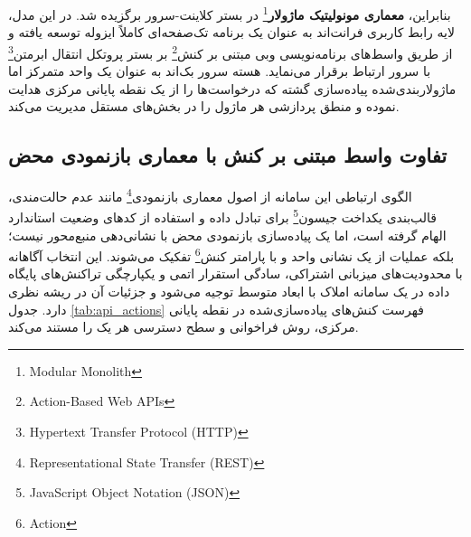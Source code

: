 \documentclass[11pt, a4paper]{report}
\newcommand{\enfootnote}[1]{\footnote{\foreignlanguage{english}{#1}}}
\begin{document}
بنابراین، \textbf{معماری مونولیتیک ماژولار}\enfootnote{Modular Monolith} در بستر کلاینت-سرور برگزیده شد. در این مدل، لایه رابط کاربری فرانت‌اند به عنوان یک برنامه تک‌صفحه‌ای کاملاً ایزوله توسعه یافته و از طریق واسط‌های برنامه‌نویسی وبی مبتنی بر کنش\enfootnote{Action-Based Web APIs} بر بستر پروتکل انتقال ابرمتن\enfootnote{Hypertext Transfer Protocol (HTTP)} با سرور ارتباط برقرار می‌نماید. هسته سرور بک‌اند به عنوان یک واحد متمرکز اما ماژولاربندی‌شده پیاده‌سازی گشته که درخواست‌ها را از یک نقطه پایانی مرکزی هدایت نموده و منطق پردازشی هر ماژول را در بخش‌های مستقل مدیریت می‌کند.

\subsection{تفاوت واسط مبتنی بر کنش با معماری بازنمودی محض}
الگوی ارتباطی این سامانه از اصول معماری بازنمودی\enfootnote{Representational State Transfer (REST)} مانند عدم حالت‌مندی، قالب‌بندی یکداخت جیسون\enfootnote{JavaScript Object Notation (JSON)} برای تبادل داده و استفاده از کدهای وضعیت استاندارد الهام گرفته است، اما یک پیاده‌سازی بازنمودی محض با نشانی‌دهی منبع‌محور نیست؛ بلکه عملیات از یک نشانی واحد و با پارامتر کنش\enfootnote{Action} تفکیک می‌شوند. این انتخاب آگاهانه با محدودیت‌های میزبانی اشتراکی، سادگی استقرار اتمی و یکپارچگی تراکنش‌های پایگاه داده در یک سامانه املاک با ابعاد متوسط توجیه می‌شود و جزئیات آن در \cite{rest} ریشه نظری دارد. جدول \ref{tab:api_actions} فهرست کنش‌های پیاده‌سازی‌شده در نقطه پایانی مرکزی، روش فراخوانی و سطح دسترسی هر یک را مستند می‌کند.
\end{document}
